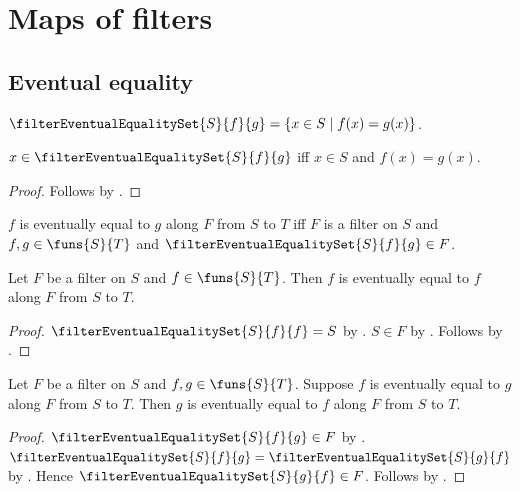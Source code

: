 \section{Maps of filters}




\subsection{Eventual equality}

\begin{definition}\label{filter_eventual_equality_set}
    $\filterEventualEqualitySet{S}{f}{g}
        =\{x\in S\mid f(x)=g(x)\}$.
\end{definition}

\begin{proposition}\label{filter_eventual_equality_set_iff}
    $x\in\filterEventualEqualitySet{S}{f}{g}$ iff
        $x\in S$ and $f(x)=g(x)$.
\end{proposition}
\begin{proof}
    Follows by .
\end{proof}

\begin{definition}\label{filter_eventually_equal}
    $f$ is eventually equal to $g$ along $F$ from $S$ to $T$ iff
        $F$ is a filter on $S$ and $f,g\in\funs{S}{T}$ and
        $\filterEventualEqualitySet{S}{f}{g}\in F$.
\end{definition}

\begin{proposition}\label{filter_eventually_equal_reflexive}
    Let $F$ be a filter on $S$ and $f\in\funs{S}{T}$.
    Then $f$ is eventually equal to $f$ along $F$ from $S$ to $T$.
\end{proposition}
\begin{proof}
    $\filterEventualEqualitySet{S}{f}{f}=S$ by
        .
    $S\in F$ by .
    Follows by .
\end{proof}

\begin{proposition}\label{filter_eventually_equal_symmetric}
    Let $F$ be a filter on $S$ and $f,g\in\funs{S}{T}$.
    Suppose $f$ is eventually equal to $g$ along $F$ from $S$ to $T$.
    Then $g$ is eventually equal to $f$ along $F$ from $S$ to $T$.
\end{proposition}
\begin{proof}
    $\filterEventualEqualitySet{S}{f}{g}\in F$ by
        .
    $\filterEventualEqualitySet{S}{f}{g}
        =\filterEventualEqualitySet{S}{g}{f}$ by
        .
    Hence $\filterEventualEqualitySet{S}{g}{f}\in F$.
    Follows by .
\end{proof}

